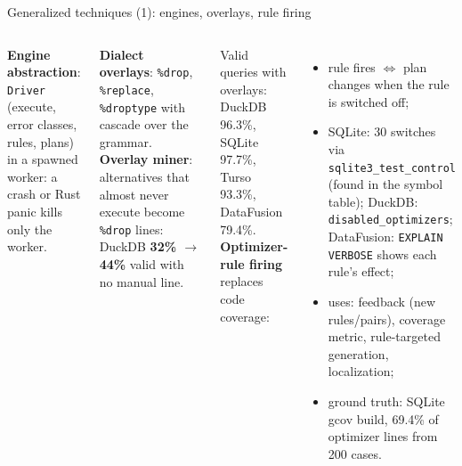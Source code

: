 \documentclass[aspectratio=169,10pt]{beamer}
\begin{document}
\begin{frame}{Generalized techniques (1): engines, overlays, rule firing}
\small
\begin{columns}[T]
\textbf{Engine abstraction}: \texttt{Driver} (execute, error classes, rules, plans) in a spawned worker: a crash or Rust panic kills only the worker.

\medskip
\textbf{Dialect overlays}: \texttt{\%drop}, \texttt{\%replace}, \texttt{\%droptype} with cascade over the \pg grammar.
\textbf{Overlay miner}: alternatives that almost never execute become \texttt{\%drop} lines: DuckDB \textbf{32\% $\rightarrow$ 44\%} valid with no manual line.

\medskip
Valid queries with overlays: DuckDB 96.3\%, SQLite 97.7\%, Turso 93.3\%, DataFusion 79.4\%.
\textbf{Optimizer-rule firing} replaces code coverage:
\begin{itemize}
  \item rule fires $\Leftrightarrow$ plan changes when the rule is switched off;
  \item SQLite: 30 switches via \texttt{sqlite3\_test\_control} (found in the symbol table); DuckDB: \texttt{disabled\_optimizers}; DataFusion: \texttt{EXPLAIN VERBOSE} shows each rule's effect;
  \item uses: feedback (new rules/pairs), coverage metric, \alert{rule-targeted generation}, localization;
  \item ground truth: SQLite gcov build, 69.4\% of optimizer lines from 200 cases.
\end{itemize}
\end{columns}
\end{frame}
\end{document}
